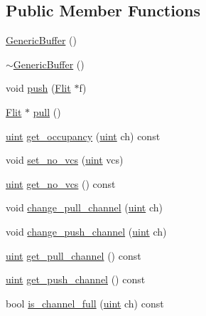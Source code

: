 \subsection*{Public Member Functions}
\begin{CompactItemize}
\item 
\hyperlink{classGenericBuffer_4281e7a40133d057f6cfad3b715084b0}{GenericBuffer} ()
\item 
\hyperlink{classGenericBuffer_d9a4c588a03bdf24a6fe586376d17e0c}{$\sim$GenericBuffer} ()
\item 
void \hyperlink{classGenericBuffer_c5a0781106485f9567898b49021f6346}{push} (\hyperlink{classFlit}{Flit} $\ast$f)
\item 
\hyperlink{classFlit}{Flit} $\ast$ \hyperlink{classGenericBuffer_6ce6f151eb6f65ec1fffafffb04a8f0e}{pull} ()
\item 
\hyperlink{outputBuffer_8h_91ad9478d81a7aaf2593e8d9c3d06a14}{uint} \hyperlink{classGenericBuffer_f2f85cf979616bab9dad5373d25d7813}{get\_\-occupancy} (\hyperlink{outputBuffer_8h_91ad9478d81a7aaf2593e8d9c3d06a14}{uint} ch) const 
\item 
void \hyperlink{classGenericBuffer_d955be71ad7a5f0bb408dccfb9fd45d3}{set\_\-no\_\-vcs} (\hyperlink{outputBuffer_8h_91ad9478d81a7aaf2593e8d9c3d06a14}{uint} vcs)
\item 
\hyperlink{outputBuffer_8h_91ad9478d81a7aaf2593e8d9c3d06a14}{uint} \hyperlink{classGenericBuffer_528c7b73ffbb3870cab0fc999a01a024}{get\_\-no\_\-vcs} () const 
\item 
void \hyperlink{classGenericBuffer_6d7fe4a638dc7eb0358c3490bf8d2cf4}{change\_\-pull\_\-channel} (\hyperlink{outputBuffer_8h_91ad9478d81a7aaf2593e8d9c3d06a14}{uint} ch)
\item 
void \hyperlink{classGenericBuffer_31e2c8b678d219fcc5d6e351f2f8623c}{change\_\-push\_\-channel} (\hyperlink{outputBuffer_8h_91ad9478d81a7aaf2593e8d9c3d06a14}{uint} ch)
\item 
\hyperlink{outputBuffer_8h_91ad9478d81a7aaf2593e8d9c3d06a14}{uint} \hyperlink{classGenericBuffer_3e87475edf8151591ef57f9ca4cd9a25}{get\_\-pull\_\-channel} () const 
\item 
\hyperlink{outputBuffer_8h_91ad9478d81a7aaf2593e8d9c3d06a14}{uint} \hyperlink{classGenericBuffer_3b5ed41f7cee8ba1fa059aaa0b9db55a}{get\_\-push\_\-channel} () const 
\item 
bool \hyperlink{classGenericBuffer_91aa6e2af039aa6c1a50a599fc3f3203}{is\_\-channel\_\-full} (\hyperlink{outputBuffer_8h_91ad9478d81a7aaf2593e8d9c3d06a14}{uint} ch) const 

\end{CompactItemize}
